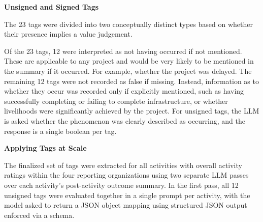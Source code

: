 \textbf{Unsigned and Signed Tags}

The 23 tags were divided into two conceptually distinct types based on whether their presence implies a value judgement.

Of the 23 tags, 12 were interpreted as not having occurred if not mentioned. These are applicable to any project and would be very likely to be mentioned in the summary if it occurred. For example, whether the project was delayed. The remaining 12 tags were not recorded as false if missing. Instead, information as to whether they occur was recorded only if explicitly mentioned, such as having successfully completing or failing to complete infrastructure, or whether livelihoods were significantly achieved by the project. For unsigned tags, the LLM is asked whether the phenomenon was clearly described as occurring, and the response is a single boolean per tag.


\textbf{Applying Tags at Scale}

The finalized set of tags were extracted for all activities with overall activity ratings within the four reporting organizations using two separate LLM passes over each activity's post-activity outcome summary. In the first pass, all 12 unsigned tags were evaluated together in a single prompt per activity, with the model asked to return a JSON object mapping using structured JSON output enforced via a schema. 



\FloatBarrier

